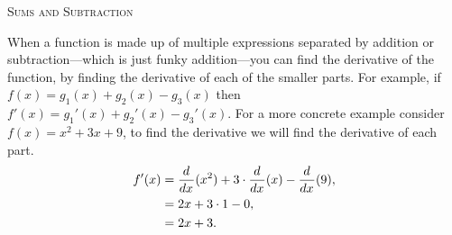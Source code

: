 \documentclass[a4paper,10pt]{article}
\newcommand{\derivof}[2][ ]{\ensuremath\frac{d^{#1}}{d#2^{#1}}}
\begin{document}
\begin{multicols*}{2}
{\large\rule{0em}{1.5em}\textsc{Sums and Subtraction}}

When a function is made up of multiple expressions separated by 
addition or subtraction---which is just funky addition---you can 
find the derivative of the function, by finding the derivative of 
each of the smaller parts. For example, if $f(x) = g_1(x) + g_2(x) - g_3(x)$
then $f'(x) = g_1'(x) + g_2'(x) - g_3'(x)$. For a more concrete example 
consider $f(x) = x^2 + 3x + 9$, to find the derivative we will 
find the derivative of each part.
\begin{align*}
f'(x) &= \derivof{x}(x^2) + 3\cdot\derivof{x}(x) - \derivof{x}(9), \\
&= 2x + 3\cdot 1 - 0, \\
&= 2x + 3.
\end{align*}

\end{multicols*}

\newpage
\end{document}

